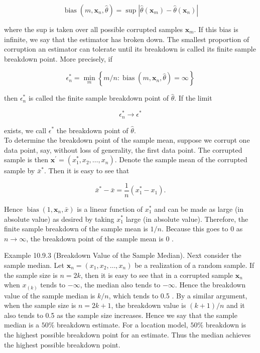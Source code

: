 \begin{equation*}
\operatorname{bias}\left(m, \mathbf{x}_{n}, \widehat{\theta}\right)=\sup \left|\widehat{\theta}\left(\mathbf{x}_{m}\right)-\widehat{\theta}\left(\mathbf{x}_{n}\right)\right| \tag{10.9.27}
\end{equation*}


where the sup is taken over all possible corrupted samples $\mathbf{x}_{m}$. If this bias is infinite, we say that the estimator has broken down. The smallest proportion of corruption an estimator can tolerate until its breakdown is called its finite sample breakdown point. More precisely, if


\begin{equation*}
\epsilon_{n}^{*}=\min _{m}\left\{m / n: \operatorname{bias}\left(m, \mathbf{x}_{n}, \widehat{\theta}\right)=\infty\right\} \tag{10.9.28}
\end{equation*}


then $\epsilon_{n}^{*}$ is called the finite sample breakdown point of $\widehat{\theta}$. If the limit


\begin{equation*}
\epsilon_{n}^{*} \rightarrow \epsilon^{*} \tag{10.9.29}
\end{equation*}


exists, we call $\epsilon^{*}$ the breakdown point of $\widehat{\theta}$.\\
To determine the breakdown point of the sample mean, suppose we corrupt one data point, say, without loss of generality, the first data point. The corrupted sample is then $\mathbf{x}^{\prime}=\left(x_{1}^{*}, x_{2}, \ldots, x_{n}\right)$. Denote the sample mean of the corrupted sample by $\bar{x}^{*}$. Then it is easy to see that

$$
\bar{x}^{*}-\bar{x}=\frac{1}{n}\left(x_{1}^{*}-x_{1}\right) .
$$

Hence $\operatorname{bias}\left(1, \mathbf{x}_{n}, \bar{x}\right)$ is a linear function of $x_{1}^{*}$ and can be made as large (in absolute value) as desired by taking $x_{1}^{*}$ large (in absolute value). Therefore, the finite sample breakdown of the sample mean is $1 / n$. Because this goes to 0 as $n \rightarrow \infty$, the breakdown point of the sample mean is 0 .

Example 10.9.3 (Breakdown Value of the Sample Median). Next consider the sample median. Let $\mathbf{x}_{n}=\left(x_{1}, x_{2}, \ldots, x_{n}\right)$ be a realization of a random sample. If the sample size is $n=2 k$, then it is easy to see that in a corrupted sample $\mathbf{x}_{n}$ when $x_{(k)}$ tends to $-\infty$, the median also tends to $-\infty$. Hence the breakdown value of the sample median is $k / n$, which tends to 0.5 . By a similar argument, when the sample size is $n=2 k+1$, the breakdown value is $(k+1) / n$ and it also tends to 0.5 as the sample size increases. Hence we say that the sample median is a $50 \%$ breakdown estimate. For a location model, $50 \%$ breakdown is the highest possible breakdown point for an estimate. Thus the median achieves the highest possible breakdown point.

